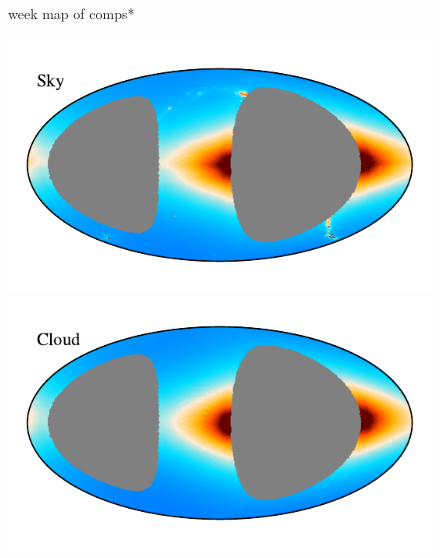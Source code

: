 \documentclass{aa}
\begin{document}
\begin{figure}
    \caption{week map of comps*}
    \label{fig: comp week}
  \end{figure}

\begin{figure}
\centering
\includegraphics[width=0.88\columnwidth]{figs/zodi_comps/zodi_sky_98_week.pdf}\includegraphics[width=0.88\columnwidth]{figs/zodi_comps/zodi_cloud_98_week.pdf}
\vspace{-0.6cm}


\end{figure}
\end{document}

